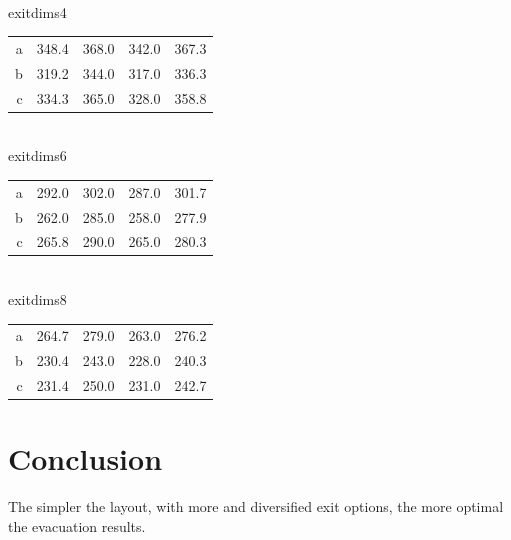 \documentclass[12pt,letterpaper]{article}
\begin{document}
\\
exitdims4
\begin{tabular}{ r | r | r | r | r }
a & 348.4 & 368.0 & 342.0 & 367.3 \\
b & 319.2 & 344.0 & 317.0 & 336.3 \\
c & 334.3 & 365.0 & 328.0 & 358.8 \\
\end{tabular}
\\
exitdims6
\begin{tabular}{ r | r | r | r | r }
a & 292.0 & 302.0 & 287.0 & 301.7 \\
b & 262.0 & 285.0 & 258.0 & 277.9 \\
c & 265.8 & 290.0 & 265.0 & 280.3 \\
\end{tabular}
\\
exitdims8
\begin{tabular}{ r | r | r | r | r }
a& 264.7& 279.0& 263.0& 276.2 \\
b& 230.4& 243.0& 228.0& 240.3 \\
c& 231.4& 250.0& 231.0& 242.7 \\
\end{tabular}
\section {Conclusion}

The simpler the layout, with more and diversified exit options, the more optimal
the evacuation results.




\end{document}
